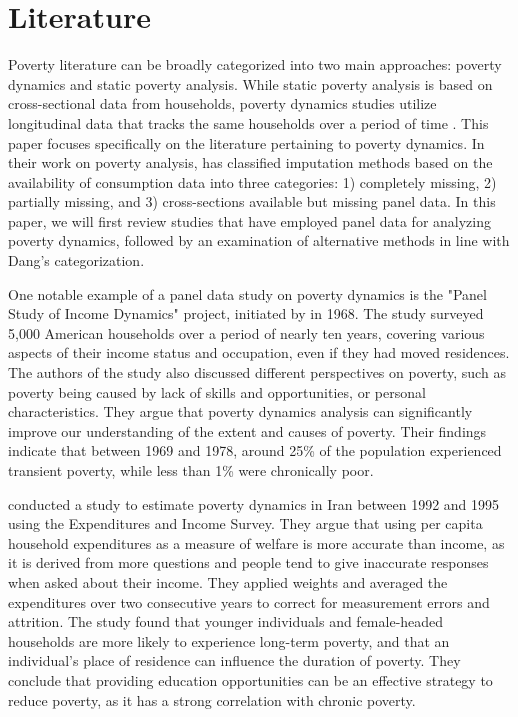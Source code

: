 \documentclass[12pt,a4paper]{article}
\begin{document}
\section{Literature}
Poverty literature can be broadly categorized into two main approaches: poverty dynamics and static poverty analysis. While static poverty analysis is based on cross-sectional data from households, poverty dynamics studies utilize longitudinal data that tracks the same households over a period of time \citep{yaqub1999poverty}. This paper focuses specifically on the literature pertaining to 
poverty dynamics.
In their work on poverty analysis, \cite{dang2020impute}
has classified imputation methods based on the availability of consumption data into three categories: 1) completely missing, 2) partially missing, and 3) cross-sections available but missing panel data. In this paper, we will first review studies that have employed panel data for analyzing poverty dynamics, followed by an examination of alternative methods in line with Dang's categorization.



One notable example of a panel data study on poverty dynamics is the "Panel Study of Income Dynamics" project, initiated by \cite{duncan1984years} in 1968. The study surveyed 5,000 American households over a period of nearly ten years, covering various aspects of their income status and occupation, even if they had moved residences. The authors of the study also discussed different perspectives on poverty, such as poverty being caused by lack of skills and opportunities, or personal characteristics. They argue that poverty dynamics analysis can significantly improve our understanding of the extent and causes of poverty. Their findings indicate that between 1969 and 1978, around 25\% of the population experienced transient poverty, while less than 1\% were chronically poor.


\cite{salehi2013mobility}
conducted a study to estimate poverty dynamics in Iran between 1992 and 1995 using the Expenditures and Income Survey. They argue that using per capita household expenditures as a measure of welfare is more accurate than income, as it is derived from more questions and people tend to give inaccurate responses when asked about their income. They applied weights and averaged the expenditures over two consecutive years to correct for measurement errors and attrition. The study found that younger individuals and female-headed households are more likely to experience long-term poverty, and that an individual's place of residence can influence the duration of poverty. They conclude that providing education opportunities can be an effective strategy to reduce poverty, as it has a strong correlation with chronic poverty.
\end{document}
